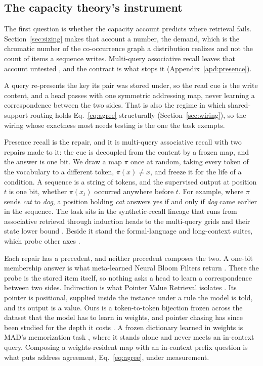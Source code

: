 \subsection{The capacity theory's instrument}
\label{sec:theorygrid}

The first question is whether the capacity account predicts where retrieval fails. Section~\ref{sec:sizing} makes that account a number, the demand, which is the chromatic number of the co-occurrence graph a distribution realizes and not the count of items a sequence writes. Multi-query associative recall leaves that account untested \citep{arora2023zoology}, and the contract is what stops it (Appendix~\ref{apd:presence}).

A query re-presents the key its pair was stored under, so the read cue is the write content, and a head passes with one symmetric addressing map, never learning a correspondence between the two sides. That is also the regime in which shared-support routing holds Eq.~\eqref{eq:agree} structurally (Section~\ref{sec:wiring}), so the wiring whose exactness most needs testing is the one the task exempts.

Presence recall is the repair, and it is multi-query associative recall with two repairs made to it: the cue is decoupled from the content by a frozen map, and the answer is one bit. We draw a map $\pi$ once at random, taking every token of the vocabulary to a different token, $\pi(x) \neq x$, and freeze it for the life of a condition. A sequence is a string of tokens, and the supervised output at position $t$ is one bit, whether $\pi(x_t)$ occurred anywhere before $t$. For example, where $\pi$ sends \emph{cat} to \emph{dog}, a position holding \emph{cat} answers yes if and only if \emph{dog} came earlier in the sequence. The task sits in the synthetic-recall lineage that runs from associative retrieval \citep{ba2016fastweights} through induction heads \citep{olsson2022induction} to the multi-query grids and their state lower bound \citep{arora2023zoology, arora2024based, jelassi2024copying}. Beside it stand the formal-language and long-context suites, which probe other axes \citep{deletang2023chomsky, liu2023flipflop, hsieh2024ruler}.

Each repair has a precedent, and neither precedent composes the two. A one-bit membership answer is what meta-learned Neural Bloom Filters return \citep{rae2019bloom}. There the probe is the stored item itself, so nothing asks a head to learn a correspondence between two sides. Indirection is what Pointer Value Retrieval isolates \citep{zhang2021pvr}. Its pointer is positional, supplied inside the instance under a rule the model is told, and its output is a value. Ours is a token-to-token bijection frozen across the dataset that the model has to learn in weights, and pointer chasing has since been studied for the depth it costs \citep{sanford2024khop}. A frozen dictionary learned in weights is MAD's memorization task \citep{poli2024mad}, where it stands alone and never meets an in-context query. Composing a weights-resident map with an in-context prefix question is what puts address agreement, Eq.~\eqref{eq:agree}, under measurement.


